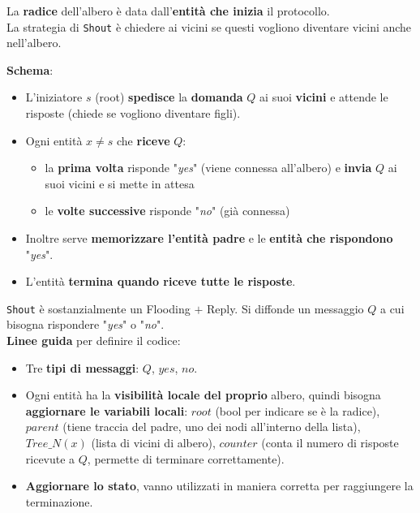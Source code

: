 La \textbf{radice} dell'albero è data dall'\textbf{entità che inizia} il protocollo.\\

La strategia di \texttt{Shout} è chiedere ai vicini se questi vogliono diventare vicini anche nell'albero.\\

\newpage

\textbf{Schema}: 
\begin{itemize}
	\item L'iniziatore $s$ (root) \textbf{spedisce} la \textbf{domanda} $Q$ ai suoi \textbf{vicini} e attende le risposte (chiede se vogliono diventare figli).\\
	
	\item Ogni entità $x \neq s$ che \textbf{riceve} $Q$:
	\begin{itemize}
		\item la \textbf{prima volta} risponde "\textit{yes}" (viene connessa all'albero) e \textbf{invia} $Q$ ai suoi vicini e si mette in attesa
		\item le \textbf{volte successive} risponde "\textit{no}" (già connessa)
	\end{itemize}
	\nn
	
	\item Inoltre serve \textbf{memorizzare l'entità padre} e le \textbf{entità che rispondono} "\textit{yes}".\\
	
	\item L'entità \textbf{termina quando riceve tutte le risposte}.\\
\end{itemize}

\texttt{Shout} è sostanzialmente un Flooding $+$ Reply. Si diffonde un messaggio $Q$ a cui bisogna rispondere "\textit{yes}" o "\textit{no}".\\

\textbf{Linee guida} per definire il codice:
\begin{itemize}
	\item Tre \textbf{tipi di messaggi}: $Q$, $yes$, $no$.\\
	
	\item Ogni entità ha la \textbf{visibilità locale del proprio} albero, quindi bisogna \textbf{aggiornare le variabili locali}: $root$ (bool per indicare se è la radice), $parent$ (tiene traccia del padre, uno dei nodi all'interno della lista), $Tree\_N(x)$ (lista di vicini di albero), $counter$ (conta il numero di risposte ricevute a $Q$, permette di terminare correttamente).\\
	
	\item \textbf{Aggiornare lo stato}, vanno utilizzati in maniera corretta per raggiungere la terminazione.\\
\end{itemize}

